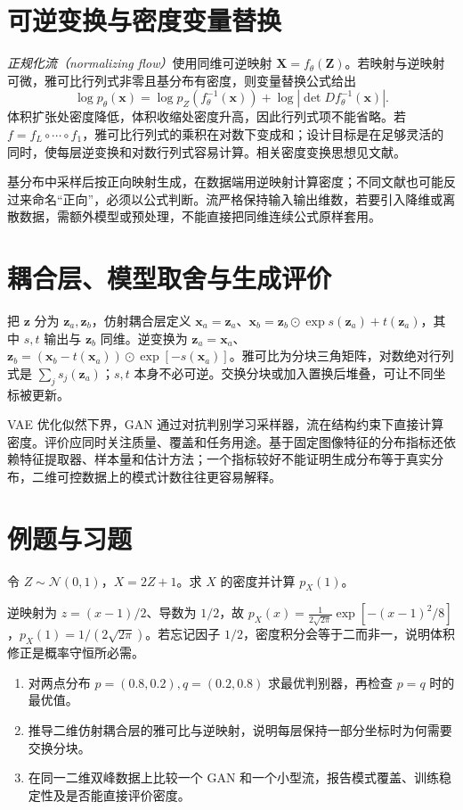 \section{可逆变换与密度变量替换}
\emph{正规化流（normalizing flow）}使用同维可逆映射 $\mathbf X=f_\theta(\mathbf Z)$。若映射与逆映射可微，雅可比行列式非零且基分布有密度，则变量替换公式给出
\begin{equation}
\log p_\theta(\mathbf x)=\log p_Z(f_\theta^{-1}(\mathbf x))
+\log|\det Df_\theta^{-1}(\mathbf x)|.
\label{eq:dl-flow-density}
\end{equation}
体积扩张处密度降低，体积收缩处密度升高，因此行列式项不能省略。若 $f=f_L\circ\cdots\circ f_1$，雅可比行列式的乘积在对数下变成和；设计目标是在足够灵活的同时，使每层逆变换和对数行列式容易计算。相关密度变换思想见文献\cite{rezende2015}。

基分布中采样后按正向映射生成，在数据端用逆映射计算密度；不同文献也可能反过来命名“正向”，必须以公式判断。流严格保持输入输出维数，若要引入降维或离散数据，需额外模型或预处理，不能直接把同维连续公式原样套用。

\section{耦合层、模型取舍与生成评价}
把 $\mathbf z$ 分为 $\mathbf z_a,\mathbf z_b$，仿射耦合层定义 $\mathbf x_a=\mathbf z_a$、$\mathbf x_b=\mathbf z_b\odot\exp s(\mathbf z_a)+t(\mathbf z_a)$，其中 $s,t$ 输出与 $\mathbf z_b$ 同维。逆变换为 $\mathbf z_a=\mathbf x_a$、$\mathbf z_b=(\mathbf x_b-t(\mathbf x_a))\odot\exp[-s(\mathbf x_a)]$。雅可比为分块三角矩阵，对数绝对行列式是 $\sum_js_j(\mathbf z_a)$；$s,t$ 本身不必可逆。交换分块或加入置换后堆叠，可让不同坐标被更新。

VAE 优化似然下界，GAN 通过对抗判别学习采样器，流在结构约束下直接计算密度。评价应同时关注质量、覆盖和任务用途。基于固定图像特征的分布指标还依赖特征提取器、样本量和估计方法；一个指标较好不能证明生成分布等于真实分布，二维可控数据上的模式计数往往更容易解释。

\section{例题与习题}
\begin{example}[缩放的密度修正]
令 $Z\sim\mathcal N(0,1)$，$X=2Z+1$。求 $X$ 的密度并计算 $p_X(1)$。
\end{example}
\begin{solve}
逆映射为 $z=(x-1)/2$、导数为 $1/2$，故 $p_X(x)=\frac1{2\sqrt{2\pi}}\exp[-(x-1)^2/8]$，$p_X(1)=1/(2\sqrt{2\pi})$。若忘记因子 $1/2$，密度积分会等于二而非一，说明体积修正是概率守恒所必需。
\end{solve}
\begin{enumerate}
\item 对两点分布 $p=(0.8,0.2),q=(0.2,0.8)$ 求最优判别器，再检查 $p=q$ 时的最优值。
\item 推导二维仿射耦合层的雅可比与逆映射，说明每层保持一部分坐标时为何需要交换分块。
\item 在同一二维双峰数据上比较一个 GAN 和一个小型流，报告模式覆盖、训练稳定性及是否能直接评价密度。
\end{enumerate}

